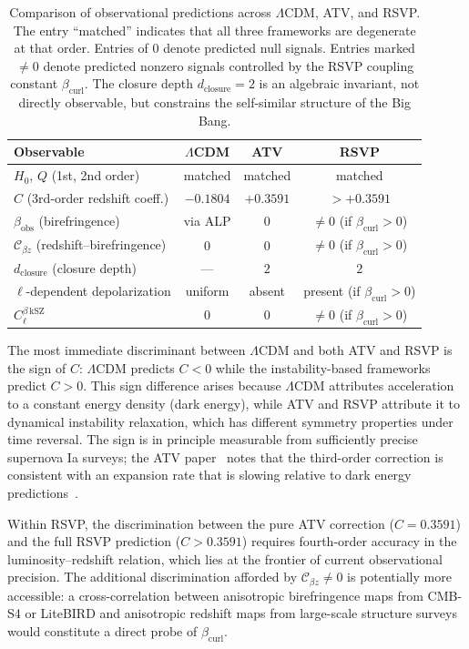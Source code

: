 \documentclass[12pt,a4paper]{article}
\theoremstyle{plain}
\theoremstyle{definition}
\theoremstyle{remark}
\newcommand{\dclos}{d_{\mathrm{closure}}}
\newcommand{\Cbz}{\mathcal{C}_{\beta z}}
\newcommand{\bcurl}{\beta_{\mathrm{curl}}}
\begin{document}
\begin{table}[ht]
\centering
\renewcommand{\arraystretch}{1.45}
\begin{tabular}{lccc}
\toprule
Observable & $\Lambda$CDM & ATV & RSVP \\
\midrule
$H_0$, $Q$ (1st, 2nd order) & matched & matched & matched \\
$C$ (3rd-order redshift coeff.) & $-0.1804$ & $+0.3591$ & $>+0.3591$ \\
$\beta_{\mathrm{obs}}$ (birefringence) & via ALP & $0$ & $\neq 0$ (if $\bcurl>0$) \\
$\Cbz$ (redshift--birefringence) & $0$ & $0$ & $\neq 0$ (if $\bcurl>0$) \\
$\dclos$ (closure depth) & --- & $2$ & $2$ \\
$\ell$-dependent depolarization & uniform & absent & present (if $\bcurl>0$) \\
$C_\ell^{\beta\,\mathrm{kSZ}}$ & $0$ & $0$ & $\neq 0$ (if $\bcurl>0$) \\
\bottomrule
\end{tabular}
\caption{Comparison of observational predictions across $\Lambda$CDM, ATV, and
RSVP. The entry ``matched'' indicates that all three frameworks are degenerate
at that order. Entries of $0$ denote predicted null signals. Entries marked
$\neq 0$ denote predicted nonzero signals controlled by the RSVP coupling constant
$\bcurl$. The closure depth $\dclos = 2$ is an algebraic invariant, not directly
observable, but constrains the self-similar structure of the Big Bang.}
\label{tab:discriminants}
\end{table}

The most immediate discriminant between $\Lambda$CDM and both ATV and RSVP is the
sign of $C$: $\Lambda$CDM predicts $C < 0$ while the instability-based frameworks
predict $C > 0$. This sign difference arises because $\Lambda$CDM attributes
acceleration to a constant energy density (dark energy), while ATV and RSVP
attribute it to dynamical instability relaxation, which has different symmetry
properties under time reversal. The sign is in principle measurable from sufficiently
precise supernova Ia surveys; the ATV paper~\cite{ATV2026} notes that the
third-order correction is consistent with an expansion rate that is slowing relative
to dark energy predictions~\cite{DESIBAO2025,DES2025}.

Within RSVP, the discrimination between the pure ATV correction ($C = 0.3591$)
and the full RSVP prediction ($C > 0.3591$) requires fourth-order accuracy in the
luminosity--redshift relation, which lies at the frontier of current observational
precision. The additional discrimination afforded by $\Cbz\neq 0$ is potentially
more accessible: a cross-correlation between anisotropic birefringence maps from
CMB-S4 or LiteBIRD and anisotropic redshift maps from large-scale structure surveys
would constitute a direct probe of $\bcurl$.
\end{document}
